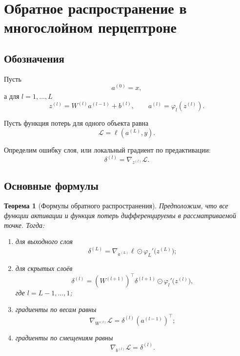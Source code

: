 \documentclass[12pt,a4paper]{article}
\theoremstyle{plain}
\newtheorem{theorem}{Теорема}[section]
\theoremstyle{definition}
\theoremstyle{remark}
\begin{document}
\section{Обратное распространение в многослойном перцептроне}

\subsection{Обозначения}

Пусть
\[
    a^{(0)}=x,
\]
а для $l=1,\ldots,L$
\[
    z^{(l)}
    =
    W^{(l)}a^{(l-1)}+b^{(l)},
    \qquad
    a^{(l)}
    =
    \varphi_l(z^{(l)}).
\]

Пусть функция потерь для одного объекта равна
\[
    \mathcal{L}
    =
    \ell(a^{(L)},y).
\]

Определим ошибку слоя, или локальный градиент по предактивации:
\[
    \delta^{(l)}
    =
    \nabla_{z^{(l)}}\mathcal{L}.
\]

\subsection{Основные формулы}

\begin{theorem}[Формулы обратного распространения]
Предположим, что все функции активации и функция потерь
дифференцируемы в рассматриваемой точке. Тогда:

\begin{enumerate}
    \item для выходного слоя
    \[
        \delta^{(L)}
        =
        \nabla_{a^{(L)}}\ell
        \odot
        \varphi_L'\bigl(z^{(L)}\bigr);
    \]

    \item для скрытых слоёв
    \[
        \delta^{(l)}
        =
        \left(
            W^{(l+1)}
        \right)^\top
        \delta^{(l+1)}
        \odot
        \varphi_l'\bigl(z^{(l)}\bigr),
    \]
    где $l=L-1,\ldots,1$;

    \item градиенты по весам равны
    \[
        \nabla_{W^{(l)}}\mathcal{L}
        =
        \delta^{(l)}
        \left(
            a^{(l-1)}
        \right)^\top;
    \]

    \item градиенты по смещениям равны
    \[
        \nabla_{b^{(l)}}\mathcal{L}
        =
        \delta^{(l)}.
    \]
\end{enumerate}
\end{theorem}
\end{document}
